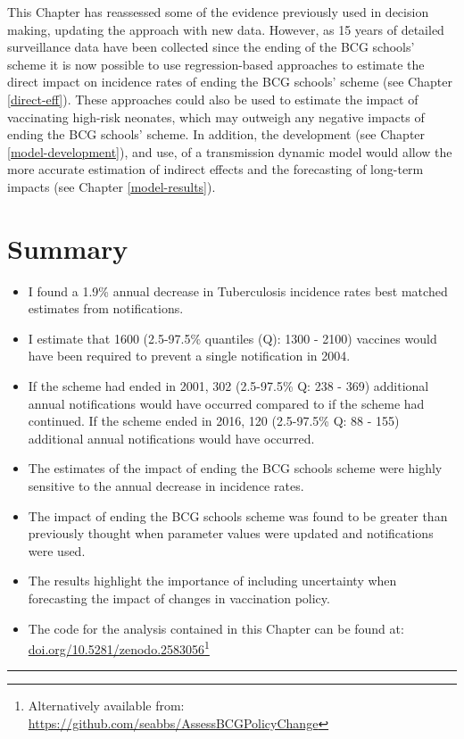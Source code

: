 \documentclass[11pt,twoside]{bristolthesis}
\begin{document}
  This Chapter has reassessed some of the evidence previously used in decision making, updating the approach with new data. However, as 15 years of detailed surveillance data have been collected since the ending of the BCG schools' scheme it is now possible to use regression-based approaches to estimate the direct impact on incidence rates of ending the BCG schools' scheme (see Chapter \ref{direct-eff}). These approaches could also be used to estimate the impact of vaccinating high-risk neonates, which may outweigh any negative impacts of ending the BCG schools' scheme. In addition, the development (see Chapter \ref{model-development}), and use, of a transmission dynamic model would allow the more accurate estimation of indirect effects and the forecasting of long-term impacts (see Chapter \ref{model-results}).
  
  \hypertarget{summary-4}{%
  \section{Summary}\label{summary-4}}
  \begin{itemize}
  \item
    I found a 1.9\% annual decrease in Tuberculosis incidence rates best matched estimates from notifications.
  \item
    I estimate that 1600 (2.5-97.5\% quantiles (Q): 1300 - 2100) vaccines would have been required to prevent a single notification in 2004.
  \item
    If the scheme had ended in 2001, 302 (2.5-97.5\% Q: 238 - 369) additional annual notifications would have occurred compared to if the scheme had continued. If the scheme ended in 2016, 120 (2.5-97.5\% Q: 88 - 155) additional annual notifications would have occurred.
  \item
    The estimates of the impact of ending the BCG schools scheme were highly sensitive to the annual decrease in incidence rates.
  \item
    The impact of ending the BCG schools scheme was found to be greater than previously thought when parameter values were updated and notifications were used.
  \item
    The results highlight the importance of including uncertainty when forecasting the impact of changes in vaccination policy.
  \item
    The code for the analysis contained in this Chapter can be found at:
    \href{https://doi.org/10.5281/zenodo.2583056}{doi.org/10.5281/zenodo.2583056}\footnote{Alternatively available from: \url{https://github.com/seabbs/AssessBCGPolicyChange}}
  \end{itemize}
  \begin{center}\rule{0.5\linewidth}{\linethickness}\end{center}
  
\end{document}
